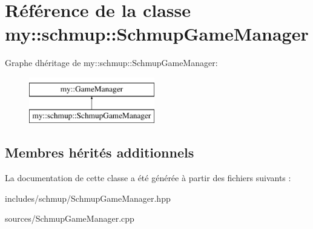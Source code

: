 \hypertarget{classmy_1_1schmup_1_1SchmupGameManager}{}\section{Référence de la classe my\+:\+:schmup\+:\+:Schmup\+Game\+Manager}
\label{classmy_1_1schmup_1_1SchmupGameManager}
Graphe d\textquotesingle{}héritage de my\+:\+:schmup\+:\+:Schmup\+Game\+Manager\+:\begin{figure}[H]
\begin{center}
\leavevmode
\includegraphics[height=2.000000cm]{classmy_1_1schmup_1_1SchmupGameManager}
\end{center}
\end{figure}
\subsection*{Membres hérités additionnels}


La documentation de cette classe a été générée à partir des fichiers suivants \+:\begin{DoxyCompactItemize}
\item 
includes/schmup/Schmup\+Game\+Manager.\+hpp\item 
sources/Schmup\+Game\+Manager.\+cpp\end{DoxyCompactItemize}
